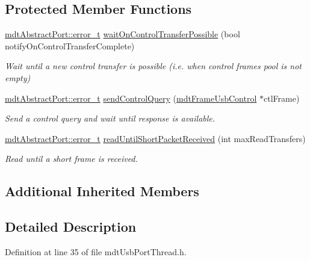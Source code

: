 \subsection*{Protected Member Functions}
\begin{DoxyCompactItemize}
\item 
\hyperlink{classmdt_abstract_port_ad4121bb930c95887e77f8bafa065a85e}{mdt\-Abstract\-Port\-::error\-\_\-t} \hyperlink{classmdt_usb_port_thread_a2d234f3900b502ecced6897facdcf029}{wait\-On\-Control\-Transfer\-Possible} (bool notify\-On\-Control\-Transfer\-Complete)
\begin{DoxyCompactList}\small\item\em Wait until a new control transfer is possible (i.\-e. when control frames pool is not empty) \end{DoxyCompactList}\item 
\hyperlink{classmdt_abstract_port_ad4121bb930c95887e77f8bafa065a85e}{mdt\-Abstract\-Port\-::error\-\_\-t} \hyperlink{classmdt_usb_port_thread_ae154415b3f311b02934405cd58eb9aa5}{send\-Control\-Query} (\hyperlink{classmdt_frame_usb_control}{mdt\-Frame\-Usb\-Control} $\ast$ctl\-Frame)
\begin{DoxyCompactList}\small\item\em Send a control query and wait until response is available. \end{DoxyCompactList}\item 
\hyperlink{classmdt_abstract_port_ad4121bb930c95887e77f8bafa065a85e}{mdt\-Abstract\-Port\-::error\-\_\-t} \hyperlink{classmdt_usb_port_thread_acca2af9704cc6894ec5b2058ca102af1}{read\-Until\-Short\-Packet\-Received} (int max\-Read\-Transfers)
\begin{DoxyCompactList}\small\item\em Read until a short frame is received. \end{DoxyCompactList}\end{DoxyCompactItemize}
\subsection*{Additional Inherited Members}


\subsection{Detailed Description}


Definition at line 35 of file mdt\-Usb\-Port\-Thread.\-h.



